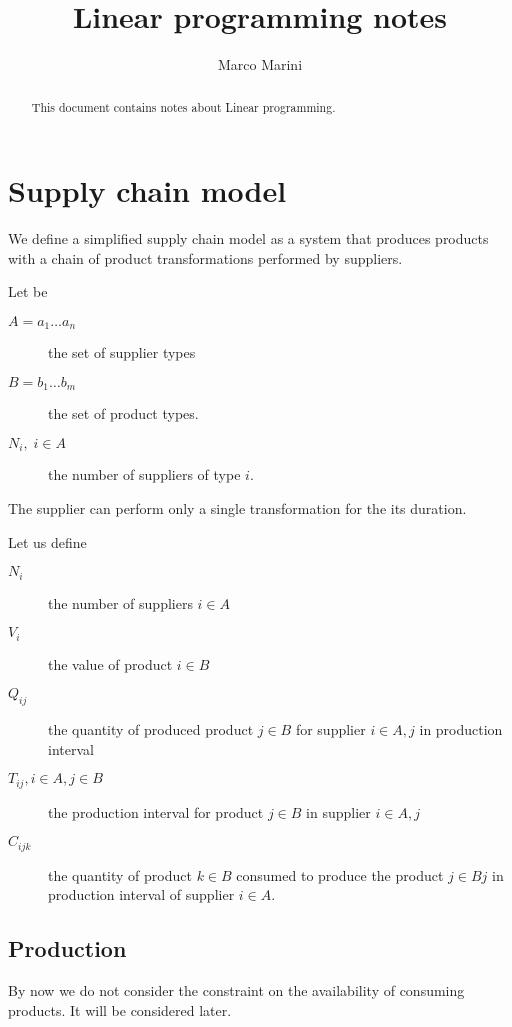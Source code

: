 \documentclass[a4paper,11pt]{article}
\title{Linear programming notes}
\author{Marco Marini}
\begin{document}
\maketitle
\tableofcontents

\begin{abstract}
This document contains notes about Linear programming.
\end{abstract}

\section{Supply chain model}

We define a simplified supply chain model as a system
that produces products with a chain of product transformations performed by suppliers.

Let be
\begin{description}
	\item [$ A = a_1 \dots a_n $]
		the set of supplier types
	\item [$ B = b_1 \dots b_m $]
		the set of product types.
	\item [$  N_i , \;i \in A $]
		the number of suppliers of type $ i $.
\end{description}

The supplier can perform only a single transformation for the its duration.

Let us define
\begin{description}
	\item[ $ N_{i} $ ]
		the number of suppliers $ i \in A $
	\item[ $ V_{i} $ ]
		the value of product $ i \in B $
	\item[ $ Q_{ij} $ ]
		the quantity of produced product $ j \in B  $ for supplier $ i \in A, j $ in production interval
	\item[ $ T_{ij}, i \in A, j \in B $ ]
		the production interval for product $ j \in B  $ in supplier $ i \in A, j $
	\item[$ C_{ijk} $ ]
		the quantity of product $ k \in B $ consumed to produce the product $ j \in Bj $ in production interval of supplier $ i \in A $.
\end{description}

\subsection{Production}

By now we do not consider the constraint on the availability of consuming products. It will be considered later.
\end{document}
